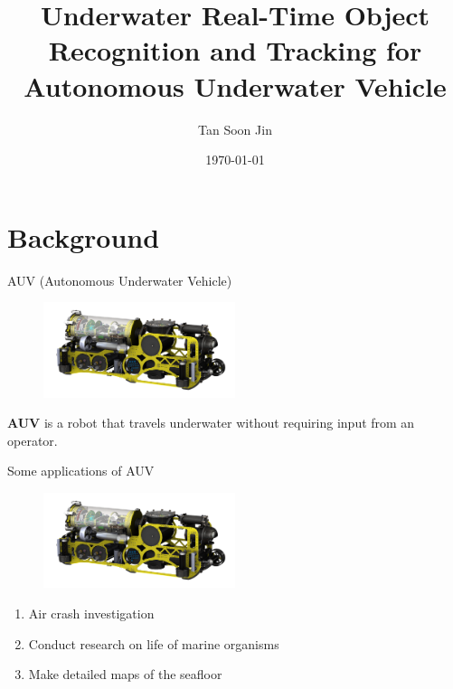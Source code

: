 \documentclass[14pt]{beamer}
\title{Underwater Real-Time Object Recognition and Tracking for Autonomous Underwater Vehicle}
\author{Tan Soon Jin}
\date{\today}
\institute{National University of Singapore}
\begin{document}
\maketitle


\section{Background}


\begin{frame}{AUV (Autonomous Underwater Vehicle)}

  \begin{figure}[ht]
      \centering
      \includegraphics[width=0.5\textwidth, height=0.3\textwidth]{figs/auv.png}
  \end{figure}

  \textbf{AUV} is a robot that travels underwater without requiring input from an operator.

\end{frame}

\begin{frame}{Some applications of AUV}

  \begin{figure}[ht]
      \centering
      \includegraphics[width=0.5\textwidth, height=0.3\textwidth]{figs/auv.png}
  \end{figure}

  \begin{enumerate}
    \item Air crash investigation
    \item Conduct research on life of marine organisms
    \item Make detailed maps of the seafloor
  \end{enumerate}

\end{frame}
\end{document}
